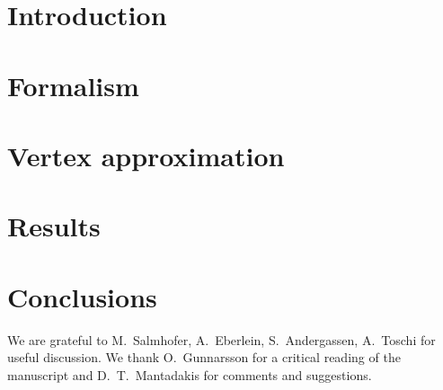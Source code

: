 \documentclass[aps,prb,twocolumn,showpacs,groupedaddress,
longbibliography]{revtex4-1}
\begin{document}
\section{Introduction}
\label{sec:introduction}


\section{Formalism}
\label{sec:formalism}

\section{Vertex approximation}
\label{sec:vertex}


\section{Results}
\label{sec:results}


\section{Conclusions}
\label{sec:conclusions}


\vspace*{5mm}
\begin{acknowledgments} 
We are grateful to M.~Salmhofer, A.~Eberlein, S.~Andergassen, A.~Toschi for useful discussion. 
We thank O.~Gunnarsson for a critical reading of the manuscript and D.~T.~Mantadakis for comments and suggestions. 
\end{acknowledgments}

\begin{appendix}

\end{appendix}


%
%
\end{document}
